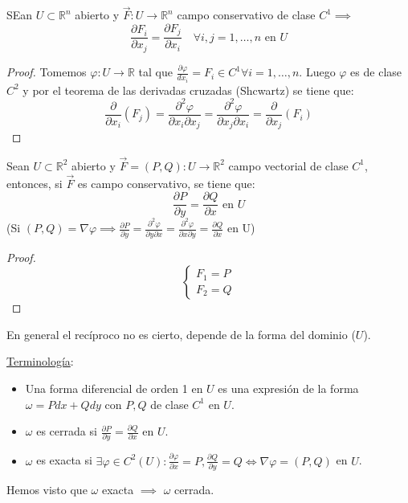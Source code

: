\begin{proposición}
SEan $U \subset \mathbb{R}^n$ abierto y $\vec{F}: U \to \mathbb{R}^n$ campo conservativo de clase $C^1 \implies$ $$\frac{\partial F_i}{\partial x_j} = \frac{\partial F_j}{\partial x_i} \quad \forall i,j = 1, \ldots, n \text{ en } U$$
\end{proposición}
\begin{proof}
    Tomemos $\varphi: U \to \mathbb{R}$ tal que $\frac{\partial\varphi}{dx_i} = F_i \in C^1 \forall i = 1, \ldots, n$. Luego $\varphi$ es de clase $C^2$ y por el teorema de las derivadas cruzadas (Shcwartz) se tiene que:
    $$\frac{\partial}{\partial x_i}(F_j) = \frac{\partial^2 \varphi}{\partial x_i \partial x_j} = \frac{\partial^2 \varphi}{\partial x_j \partial x_i} = \frac{\partial}{\partial x_j}(F_i)$$
\end{proof}
\begin{corolario}
    Sean $U \subset \mathbb{R}^2$ abierto y $\vec{F} = (P, Q): U \to \mathbb{R}^2$ campo vectorial de clase $C^1$, entonces, si $\vec{F}$ es campo conservativo, se tiene que:
    $$\frac{\partial P}{\partial y} = \frac{\partial Q}{\partial x} \text{ en } U$$
    (Si $(P, Q) = \nabla \varphi \implies \frac{\partial P}{\partial y} = \frac{\partial^2 \varphi}{\partial y \partial x} = \frac{\partial^2 \varphi}{\partial x \partial y} = \frac{\partial Q}{\partial x}$ en U)
\end{corolario}
\begin{proof}
    $$\begin{cases}
            F_1 = P \\ F_2 = Q
        \end{cases}$$
\end{proof}
\begin{observación}
En general el recíproco no es cierto, depende de la forma del dominio ($U$).
\end{observación}
\begin{observación}
\underline{Terminología}:
\begin{itemize}
    \item Una forma diferencial de orden 1 en $U$ es una expresión de la forma $\omega =
              Pdx + Qdy$ con $P, Q$ de clase $C^1$ en $U$.
    \item $\omega$ es cerrada si $\frac{\partial P}{\partial y} = \frac{\partial Q}{\partial x}$ en $U$.
    \item $\omega$ es exacta si $\exists \varphi \in C^2(U) : \frac{\partial\varphi}{\partial x} = P, \frac{\partial Q}{\partial y} = Q \iff \nabla \varphi = (P, Q)$ en $U$.
\end{itemize}
Hemos visto que $\omega$ exacta $\implies$ $\omega$ cerrada.
\end{observación}


